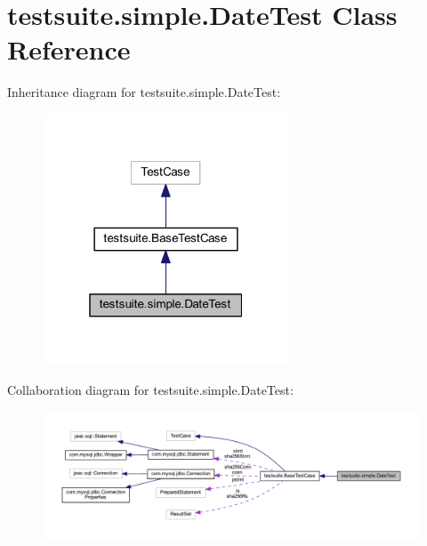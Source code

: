 \hypertarget{classtestsuite_1_1simple_1_1_date_test}{}\section{testsuite.\+simple.\+Date\+Test Class Reference}
\label{classtestsuite_1_1simple_1_1_date_test}


Inheritance diagram for testsuite.\+simple.\+Date\+Test\+:
\nopagebreak
\begin{figure}[H]
\begin{center}
\leavevmode
\includegraphics[width=208pt]{classtestsuite_1_1simple_1_1_date_test__inherit__graph}
\end{center}
\end{figure}


Collaboration diagram for testsuite.\+simple.\+Date\+Test\+:
\nopagebreak
\begin{figure}[H]
\begin{center}
\leavevmode
\includegraphics[width=350pt]{classtestsuite_1_1simple_1_1_date_test__coll__graph}
\end{center}
\end{figure}
